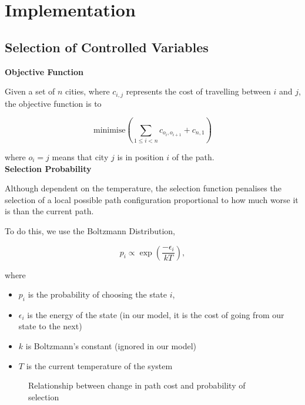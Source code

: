 \documentclass{article}
\begin{document}
\newpage
\section{Implementation}


\subsection{Selection of Controlled Variables}

\textbf{Objective Function}

Given a set of $n$ cities, where $c_{i,j}$ represents the cost of travelling between $i$ and $j$, the objective function is to

$$\text{minimise}\left( \sum_{1 \leq i < n} c_{o_i, o_{i + 1}} + c_{n, 1}\right)$$

where $o_i = j$ means that city $j$ is in position $i$ of the path.
\\

\textbf{Selection Probability}

Although dependent on the temperature, the selection function penalises the selection of a local possible path configuration proportional to how much worse it is than the current path.

To do this, we use the Boltzmann Distribution,

$$p_i \propto \exp \left( \frac{- \epsilon_i}{kT} \right),$$

where
\begin{itemize}
    \item $p_i$ is the probability of choosing the state $i$,
    \item $\epsilon_i$ is the energy of the state (in our model, it is the cost of going from our state to the next)
    \item $k$ is Boltzmann's constant (ignored in our model)
    \item $T$ is the current temperature of the system
\end{itemize}


\begin{figure}[H]
    \centering
    \caption{Relationship between change in path cost and probability of selection}
\end{figure}
\end{document}
